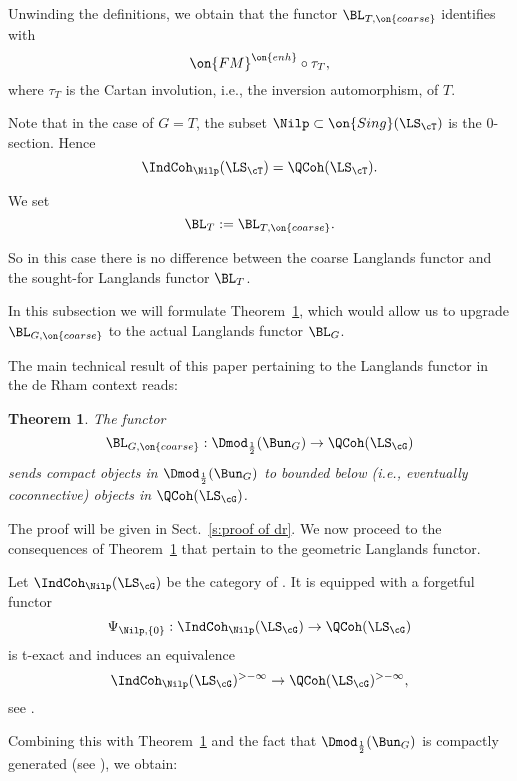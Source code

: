 \documentclass[9pt]{amsart}
\newtheorem{thm}[subsubsection]{Theorem}
\theoremstyle{remark}
\theoremstyle{definition}
\theoremstyle{remark}
\newcommand{\thmref}[1]{Theorem~\ref{#1}}
\newcommand{\secref}[1]{Sect.~\ref{#1}}
\numberwithin{equation}{section}
\begin{document}
\sssec{}

Unwinding the definitions, we obtain that the functor $\BL_{T,\on{coarse}}$ identifies with
$$\on{FM}^{\on{enh}}\circ \tau_T,$$
where $\tau_T$ is the Cartan involution, i.e., the inversion automorphism, of $T$.

\sssec{}

Note that in the case of $G=T$, the subset $\Nilp\subset \on{Sing}(\LS_\cT)$ is the $0$-section. Hence
$$\IndCoh_\Nilp(\LS_\cT)=\QCoh(\LS_\cT).$$

We set
$$\BL_T:=\BL_{T,\on{coarse}}.$$

So in this case there is no difference between the coarse Langlands functor and the sought-for
Langlands functor $\BL_T$. 


In this subsection we will formulate \thmref{t:compact to bdd below dr}, which would allow us to upgrade $\BL_{G,\on{coarse}}$
to the actual Langlands functor $\BL_G$. 

\sssec{}

The main technical result of this paper pertaining to the Langlands functor in the de Rham context reads:

\begin{thm} \label{t:compact to bdd below dr}
The functor
$$\BL_{G,\on{coarse}}:\Dmod_{\frac{1}{2}}(\Bun_G)\to \QCoh(\LS_\cG)$$
sends compact objects in $\Dmod_{\frac{1}{2}}(\Bun_G)$ to bounded below (i.e., eventually coconnective)
objects in $\QCoh(\LS_\cG)$.
\end{thm} 

The proof will be given in \secref{s:proof of dr}. We now proceed to the consequences of \thmref{t:compact to bdd below dr}
that pertain to the geometric Langlands functor. 

\sssec{}

Let $\IndCoh_\Nilp(\LS_\cG)$ be the category of \cite[Sect. 11.1.5]{AG}. It is equipped with a forgetful functor  
\begin{equation} \label{e:coarsening}
\Psi_{\Nilp,\{0\}}:\IndCoh_\Nilp(\LS_\cG)\to  \QCoh(\LS_\cG)
\end{equation} 
is t-exact and induces an equivalence 
$$\IndCoh_\Nilp(\LS_\cG)^{>-\infty}\to \QCoh(\LS_\cG)^{>-\infty},$$
see \cite[Proposition 4.4.5]{AG}. 

\sssec{}

Combining this with \thmref{t:compact to bdd below dr} and the fact that $\Dmod_{\frac{1}{2}}(\Bun_G)$
is compactly generated (see \cite[Theorem 0.1.2]{DG1}), we obtain:
\end{document}
